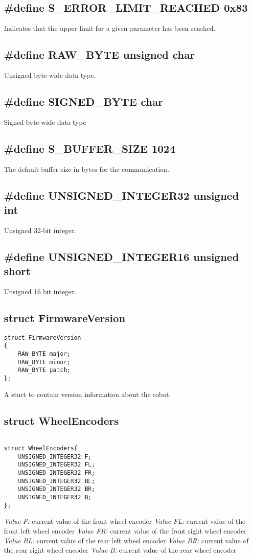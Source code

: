 \documentclass{book}
\begin{document}
\subsection{\#define S\_ERROR\_LIMIT\_REACHED 0x83}
Indicates that the upper limit for a given parameter has been reached. 

\subsection{\#define RAW\_BYTE unsigned char}
Unsigned byte-wide data type.
\subsection{\#define SIGNED\_BYTE char}
Signed byte-wide data type
\subsection{\#define S\_BUFFER\_SIZE 1024}
The default buffer size in bytes for the communication.
\subsection{\#define UNSIGNED\_INTEGER32 unsigned int}
Unsigned 32-bit integer.
\subsection{\#define UNSIGNED\_INTEGER16 unsigned short}
Unsigned 16 bit integer.

\subsection{struct FirmwareVersion}

\begin{lstlisting}
struct FirmwareVersion
{
	RAW_BYTE major;
	RAW_BYTE minor;
	RAW_BYTE patch;
};
\end{lstlisting}
A stuct to contain version information about the robot.

\subsection{struct WheelEncoders}
\begin{lstlisting}

struct WheelEncoders{
	UNSIGNED_INTEGER32 F;
	UNSIGNED_INTEGER32 FL;
	UNSIGNED_INTEGER32 FR;
	UNSIGNED_INTEGER32 BL;
	UNSIGNED_INTEGER32 BR;
	UNSIGNED_INTEGER32 B;
};

\end{lstlisting}
\textit{Value F:} current value of the front wheel encoder
\textit{Value FL:} current value of the front left wheel encoder
\textit{Value FR: }current value of the front right wheel encoder
\textit{Value BL: }current value of the rear left wheel encoder
\textit{Value BR: }current value of the rear right wheel encoder
\textit{Value B: }current value of the rear wheel encoder
\end{document}
